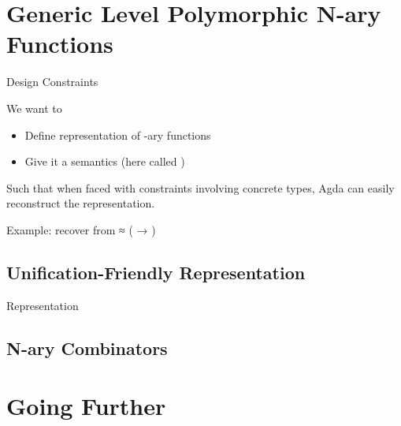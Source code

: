 \documentclass[compress,9pt]{beamer}
\begin{document}
\section{Generic Level Polymorphic N-ary Functions}

\begin{frame}{Design Constraints}

  We want to
  \begin{itemize}
    \item Define representation of -ary functions
    \item Give it a semantics (here called )
  \end{itemize}

  \bigskip
  Such that when faced with constraints involving concrete types,
  Agda can easily reconstruct the representation.

  \bigskip
  Example: recover  from {   ≈ ( → )}
\end{frame}

\subsection{Unification-Friendly Representation}

\begin{frame}{Representation}
  \begin{minipage}{0.5\textwidth}
  \end{minipage}\begin{minipage}{0.4\textwidth}
  \end{minipage}
\end{frame}

\subsection{N-ary Combinators}

\section{Going Further}
\end{document}
